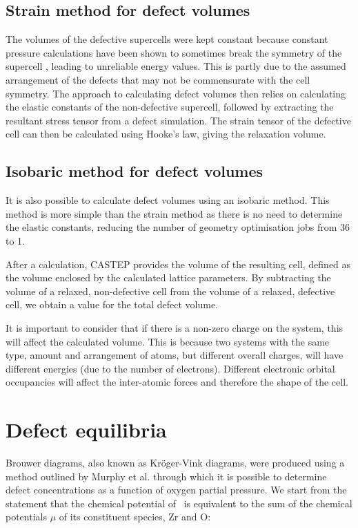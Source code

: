 \subsection{Strain method for defect volumes}

The volumes of the defective supercells were kept constant because constant pressure calculations have been shown to sometimes break the symmetry of the supercell \cite{samanta2010thermodynamic}, leading to unreliable energy values. This is partly due to the assumed arrangement of the defects that may not be commensurate with the cell symmetry. The approach to calculating defect volumes then relies on calculating the elastic constants of the non-defective supercell, followed by extracting the resultant stress tensor from a defect simulation. The strain tensor of the defective cell can then be calculated using Hooke's law, giving the relaxation volume. 

\subsection{Isobaric method for defect volumes}

It is also possible to calculate defect volumes using an isobaric method. This method is more simple than the strain method as there is no need to determine the elastic constants, reducing the number of geometry optimisation jobs from 36 to 1. 

After a calculation, CASTEP provides the volume of the resulting cell, defined as the volume enclosed by the calculated lattice parameters. By subtracting the volume of a relaxed, non-defective cell from the volume of a relaxed, defective cell, we obtain a value for the total defect volume. %

It is important to consider that if there is a non-zero charge on the system, this will affect the calculated volume. This is because two systems with the same type, amount and arrangement of atoms, but different overall charges, will have different energies (due to the number of electrons). Different electronic orbital occupancies will affect the inter-atomic forces and therefore the shape of the cell. 

\section{Defect equilibria}

Brouwer diagrams, also known as Kr{\"o}ger-Vink diagrams, were produced using a method outlined by Murphy et al. \cite{Murphy2014} through which it is possible to determine defect concentrations as a function of oxygen partial pressure. We start from the statement that the chemical potential of \zirconia\ is equivalent to the sum of the chemical potentials $\mu$ of its constituent species, Zr and O:

